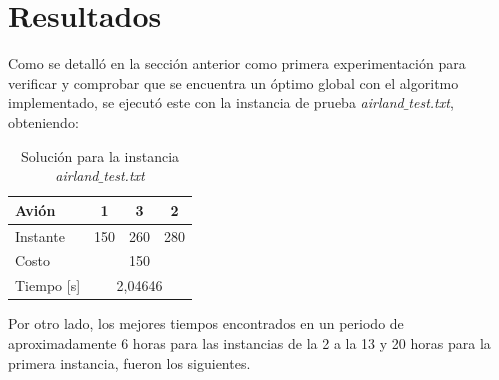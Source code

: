\documentclass[letter, 10pt]{article}
\begin{document}
\section{Resultados}
Como se detalló en la sección anterior como primera experimentación para verificar y comprobar que se encuentra un óptimo global con el algoritmo implementado, se ejecutó este con la instancia de prueba \textit{airland$\_$test.txt}, obteniendo:\\
    \begin{table}[h]
    \centering
    \begin{tabular}{|l|c|l|l|}
    \hline
    Avión          & 1                        & \multicolumn{1}{c|}{3} & \multicolumn{1}{c|}{2} \\ \hline
    Instante       & \multicolumn{1}{l|}{150} & 260                    & 280                    \\ \hline
    Costo          & \multicolumn{3}{c|}{150}                                                   \\ \hline
    Tiempo {[}s{]} & \multicolumn{3}{c|}{2,04646}                                               \\ \hline
    \end{tabular}
    \caption{Solución para la instancia \textit{airland$\_$test.txt}}
    \end{table}
    
Por otro lado, los mejores tiempos encontrados en un periodo de aproximadamente 6 horas para las instancias de la 2 a la 13 y 20 horas para la primera instancia, fueron los siguientes.
\end{document}
